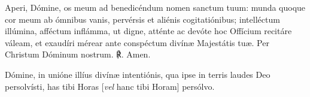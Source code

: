 \vspace{0.5ex}

Aperi, Dómine, os meum ad benedicéndum nomen sanctum tuum: munda quoque cor meum ab ó\-mnibus vanis, pervérsis et aliénis cogitatiónibus; intelléctum illúmina, affé\-ctum inflámma, ut digne, atténte ac devóte hoc Offícium recitáre váleam, et exaudíri mérear ante conspéctum divínæ Majestátis tuæ. Per Christum Dóminum nostrum. ℟. Amen.

Dómine, in unióne illíus divínæ intentiónis, qua ipse in terris laudes Deo persolvísti, has tibi Horas [\textit{vel} hanc tibi Horam] persólvo.
